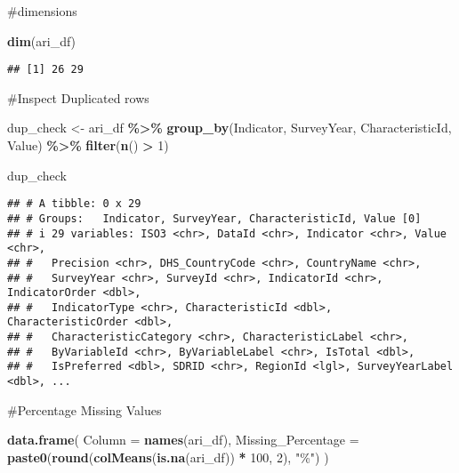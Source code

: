 \documentclass[
]{article}
\newenvironment{Shaded}{\begin{snugshade}}{\end{snugshade}}
\newcommand{\AttributeTok}[1]{\textcolor[rgb]{0.13,0.29,0.53}{#1}}
\newcommand{\DecValTok}[1]{\textcolor[rgb]{0.00,0.00,0.81}{#1}}
\newcommand{\FunctionTok}[1]{\textcolor[rgb]{0.13,0.29,0.53}{\textbf{#1}}}
\newcommand{\NormalTok}[1]{#1}
\newcommand{\OtherTok}[1]{\textcolor[rgb]{0.56,0.35,0.01}{#1}}
\newcommand{\SpecialCharTok}[1]{\textcolor[rgb]{0.81,0.36,0.00}{\textbf{#1}}}
\newcommand{\StringTok}[1]{\textcolor[rgb]{0.31,0.60,0.02}{#1}}
\begin{document}
\#dimensions

\begin{Shaded}
\begin{Highlighting}[]
\FunctionTok{dim}\NormalTok{(ari\_df)}
\end{Highlighting}
\end{Shaded}

\begin{verbatim}
## [1] 26 29
\end{verbatim}

\#Inspect Duplicated rows

\begin{Shaded}
\begin{Highlighting}[]
\NormalTok{dup\_check }\OtherTok{\textless{}{-}}\NormalTok{ ari\_df }\SpecialCharTok{\%\textgreater{}\%}
  \FunctionTok{group\_by}\NormalTok{(Indicator, SurveyYear, CharacteristicId, Value) }\SpecialCharTok{\%\textgreater{}\%}
  \FunctionTok{filter}\NormalTok{(}\FunctionTok{n}\NormalTok{() }\SpecialCharTok{\textgreater{}} \DecValTok{1}\NormalTok{)}

\NormalTok{dup\_check}
\end{Highlighting}
\end{Shaded}

\begin{verbatim}
## # A tibble: 0 x 29
## # Groups:   Indicator, SurveyYear, CharacteristicId, Value [0]
## # i 29 variables: ISO3 <chr>, DataId <chr>, Indicator <chr>, Value <chr>,
## #   Precision <chr>, DHS_CountryCode <chr>, CountryName <chr>,
## #   SurveyYear <chr>, SurveyId <chr>, IndicatorId <chr>, IndicatorOrder <dbl>,
## #   IndicatorType <chr>, CharacteristicId <dbl>, CharacteristicOrder <dbl>,
## #   CharacteristicCategory <chr>, CharacteristicLabel <chr>,
## #   ByVariableId <chr>, ByVariableLabel <chr>, IsTotal <dbl>,
## #   IsPreferred <dbl>, SDRID <chr>, RegionId <lgl>, SurveyYearLabel <dbl>, ...
\end{verbatim}

\#Percentage Missing Values

\begin{Shaded}
\begin{Highlighting}[]
\FunctionTok{data.frame}\NormalTok{(}
  \AttributeTok{Column =} \FunctionTok{names}\NormalTok{(ari\_df),}
  \AttributeTok{Missing\_Percentage =} \FunctionTok{paste0}\NormalTok{(}\FunctionTok{round}\NormalTok{(}\FunctionTok{colMeans}\NormalTok{(}\FunctionTok{is.na}\NormalTok{(ari\_df)) }\SpecialCharTok{*} \DecValTok{100}\NormalTok{, }\DecValTok{2}\NormalTok{), }\StringTok{"\%"}\NormalTok{)}
\NormalTok{  )}
\end{Highlighting}
\end{Shaded}
\end{document}
